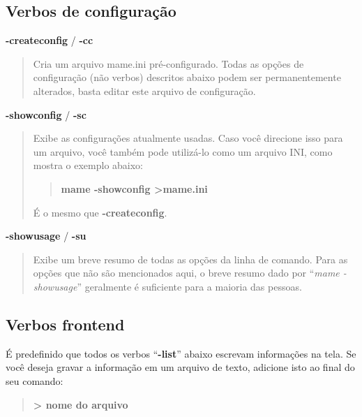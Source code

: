 \documentclass[letterpaper,10pt,brazil]{sphinxmanual}
\begin{document}
\subsection{Verbos de configuração}
\label{commandline/commandline-all:verbos-de-configuracao}\label{commandline/commandline-all:mame-commandline-createconfig}
\textbf{-createconfig} / \textbf{-cc}
\begin{quote}

Cria um arquivo mame.ini pré-configurado. Todas as opções de
configuração (não verbos) descritos abaixo podem ser permanentemente
alterados, basta editar este arquivo de configuração.
\end{quote}
\label{commandline/commandline-all:mame-commandline-showconfig}
\textbf{-showconfig} / \textbf{-sc}
\begin{quote}

Exibe as configurações atualmente usadas. Caso você direcione isso
para um arquivo, você também pode utilizá-lo como um arquivo INI,
como mostra o exemplo abaixo:
\begin{quote}

\textbf{mame -showconfig \textgreater{}mame.ini}
\end{quote}

É o mesmo que \textbf{-createconfig}.
\end{quote}
\label{commandline/commandline-all:mame-commandline-showusage}
\textbf{-showusage} / \textbf{-su}
\begin{quote}

Exibe um breve resumo de todas as opções da linha de comando.
Para as opções que não são mencionados aqui, o breve resumo dado por
``\emph{mame -showusage}'' geralmente é suficiente para a maioria das
pessoas.
\end{quote}


\subsection{Verbos frontend}
\label{commandline/commandline-all:verbos-frontend}
É predefinido que todos os verbos ``\textbf{-list}'' abaixo escrevam
informações na tela. Se você deseja gravar a informação em um arquivo de
texto, adicione isto ao final do seu comando:
\begin{quote}

\textbf{\textgreater{} nome do arquivo}
\end{quote}
\end{document}
